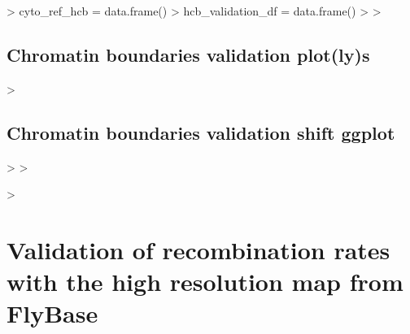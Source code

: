 \documentclass{article}
\begin{document}
\begin{Schunk}
\begin{Sinput}
> cyto_ref_hcb = data.frame()
> hcb_validation_df = data.frame()
> 
> 
\end{Sinput}
\end{Schunk}

\subsection{Chromatin boundaries validation plot(ly)s}
\begin{Schunk}
\begin{Sinput}
> 
\end{Sinput}
\end{Schunk}


\subsection{Chromatin boundaries validation shift ggplot}
\begin{Schunk}
\begin{Sinput}
> 
> 
\end{Sinput}
\end{Schunk}

\begin{Schunk}
\begin{Sinput}
> 
\end{Sinput}
\end{Schunk}

\section{Validation of recombination rates with the high resolution map from FlyBase}
\end{document}
